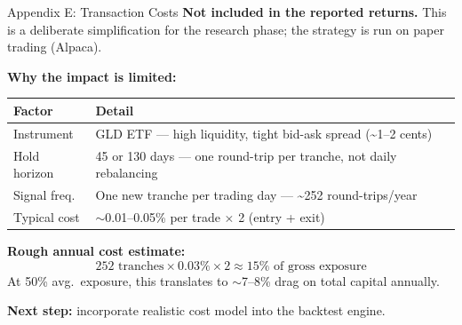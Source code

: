 \documentclass[aspectratio=169]{beamer}
\begin{document}
\begin{frame}{Appendix E: Transaction Costs}
  \small
  \textbf{Not included in the reported returns.} This is a deliberate simplification
  for the research phase; the strategy is run on paper trading (Alpaca).

  \vspace{0.5em}
  \textbf{Why the impact is limited:}

  \vspace{0.3em}
  \begin{tabular}{ll}
    \toprule
    Factor & Detail \\
    \midrule
    Instrument   & GLD ETF — high liquidity, tight bid-ask spread (\textasciitilde1--2 cents) \\
    Hold horizon & 45 or 130 days — one round-trip per tranche, not daily rebalancing \\
    Signal freq. & One new tranche per trading day — \textasciitilde252 round-trips/year \\
    Typical cost & $\sim$0.01--0.05\% per trade $\times$ 2 (entry + exit) \\
    \bottomrule
  \end{tabular}

  \vspace{0.5em}
  \textbf{Rough annual cost estimate:}
  \[
    252 \text{ tranches} \times 0.03\% \times 2 \approx 15\% \text{ of gross exposure}
  \]
  At 50\% avg.\ exposure, this translates to $\sim$7--8\% drag on total capital annually.

  \vspace{0.3em}
  \textbf{Next step:} incorporate realistic cost model into the backtest engine.
\end{frame}
\end{document}
